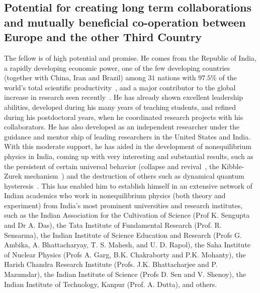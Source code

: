 \documentclass[a4paper,11pt,color]{article}
\begin{document}
\subsection{Potential for creating long term collaborations and mutually beneficial co-operation between
Europe and the other Third Country }
\label{sec:impact_potential}
The fellow is of high potential and promise. He comes from the Republic of India, a rapidly developing economic power, one of the few developing countries (together with China, Iran and Brazil) among $31$ nations with $97.5$\% of the world's total scientific productivity~\cite{scimpact}, and a major contributor to the global increase in research seen recently~\cite{indoaglob}. He has already shown excellent leadership abilities, developed during his many years of teaching students, and refined during his postdoctoral years, when he coordinated research projects with his collaborators. He has also developed as an independent researcher under the guidance and mentor ship of leading researchers in the United States and India. With this moderate support, he has aided in the development of nonequilibrium physics in India, coming up with very interesting and substantial results, such as the persistent of certain universal behavior (collapse and revival~\cite{colrev}, the Kibble-Zurek mechanism~\cite{fermidyn}) and 
the destruction of others such as dynamical quantum hysteresis~\cite{fermidyn}. This 
has enabled him to establish himself in an extensive network of Indian academics who work in nonequilibrium physics (both theory and experiment) from India's most prominent universities and research institutes, such as the Indian Association for the Cultivation of Science (Prof K. Sengupta and Dr A. Das), the Tata Institute of Fundamental Research (Prof. R. Sensarma), the Indian Institute of Science Education and Research (Profs G. Ambika,  A. Bhattacharyay,  T. S. Mahesh, and U. D. Rapol), the Saha Institute of Nuclear Physics (Profs A. Garg, B.K. Chakraborty and P.K. Mohanty), the Harish Chandra Research Institute (Profs. J.K. Bhattacharjee and P. Mazumdar), the Indian Institute of Science (Profs D. Sen and V. Shenoy), the Indian Institute of Technology, Kanpur (Prof. A. Dutta), and others.
\end{document}
